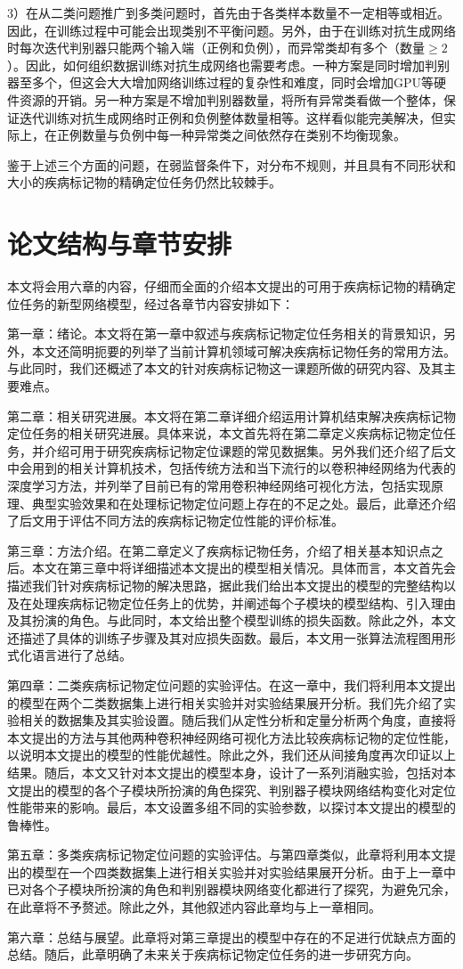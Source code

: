 3）在从二类问题推广到多类问题时，首先由于各类样本数量不一定相等或相近。因此，在训练过程中可能会出现类别不平衡问题。另外，由于在训练对抗生成网络时每次迭代判别器只能两个输入端（正例和负例），而异常类却有多个（数量$\geq 2$）。因此，如何组织数据训练对抗生成网络也需要考虑。一种方案是同时增加判别器至多个，但这会大大增加网络训练过程的复杂性和难度，同时会增加GPU等硬件资源的开销。另一种方案是不增加判别器数量，将所有异常类看做一个整体，保证迭代训练对抗生成网络时正例和负例整体数量相等。这样看似能完美解决，但实际上，在正例数量与负例中每一种异常类之间依然存在类别不均衡现象。

鉴于上述三个方面的问题，在弱监督条件下，对分布不规则，并且具有不同形状和大小的疾病标记物的精确定位任务仍然比较棘手。

\section{论文结构与章节安排}\label{sec:arrangement}
本文将会用六章的内容，仔细而全面的介绍本文提出的可用于疾病标记物的精确定位任务的新型网络模型，经过各章节内容安排如下：

第一章：绪论。本文将在第一章中叙述与疾病标记物定位任务相关的背景知识，另外，本文还简明扼要的列举了当前计算机领域可解决疾病标记物任务的常用方法。与此同时，我们还概述了本文的针对疾病标记物这一课题所做的研究内容、及其主要难点。

第二章：相关研究进展。本文将在第二章详细介绍运用计算机结束解决疾病标记物定位任务的相关研究进展。具体来说，本文首先将在第二章定义疾病标记物定位任务，并介绍可用于研究疾病标记物定位课题的常见数据集。另外我们还介绍了后文中会用到的相关计算机技术，包括传统方法和当下流行的以卷积神经网络为代表的深度学习方法，并列举了目前已有的常用卷积神经网络可视化方法，包括实现原理、典型实验效果和在处理标记物定位问题上存在的不足之处。最后，此章还介绍了后文用于评估不同方法的疾病标记物定位性能的评价标准。

第三章：方法介绍。在第二章定义了疾病标记物任务，介绍了相关基本知识点之后。本文在第三章中将详细描述本文提出的模型相关情况。具体而言，本文首先会描述我们针对疾病标记物的解决思路，据此我们给出本文提出的模型的完整结构以及在处理疾病标记物定位任务上的优势，并阐述每个子模块的模型结构、引入理由及其扮演的角色。与此同时，本文给出整个模型训练的损失函数。除此之外，本文还描述了具体的训练子步骤及其对应损失函数。最后，本文用一张算法流程图用形式化语言进行了总结。

第四章：二类疾病标记物定位问题的实验评估。在这一章中，我们将利用本文提出的模型在两个二类数据集上进行相关实验并对实验结果展开分析。我们先介绍了实验相关的数据集及其实验设置。随后我们从定性分析和定量分析两个角度，直接将本文提出的方法与其他两种卷积神经网络可视化方法比较疾病标记物的定位性能，以说明本文提出的模型的性能优越性。除此之外，我们还从间接角度再次印证以上结果。随后，本文又针对本文提出的模型本身，设计了一系列消融实验，包括对本文提出的模型的各个子模块所扮演的角色探究、判别器子模块网络结构变化对定位性能带来的影响。最后，本文设置多组不同的实验参数，以探讨本文提出的模型的鲁棒性。

第五章：多类疾病标记物定位问题的实验评估。与第四章类似，此章将利用本文提出的模型在一个四类数据集上进行相关实验并对实验结果展开分析。由于上一章中已对各个子模块所扮演的角色和判别器模块网络变化都进行了探究，为避免冗余，在此章将不予赘述。除此之外，其他叙述内容此章均与上一章相同。

第六章：总结与展望。此章将对第三章提出的模型中存在的不足进行优缺点方面的总结。随后，此章明确了未来关于疾病标记物定位任务的进一步研究方向。
